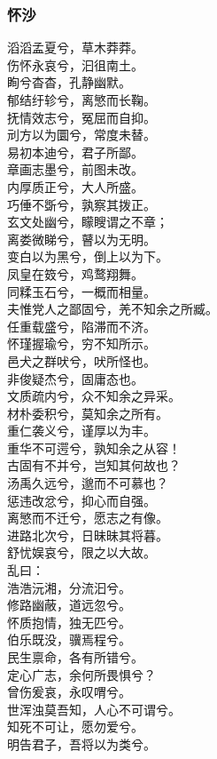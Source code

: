 \documentclass[]{article}
\begin{document}
\hypertarget{header-n2861}{%
\subsubsection{怀沙}\label{header-n2861}}

滔滔孟夏兮，草木莽莽。\\
伤怀永哀兮，汩徂南土。\\
眴兮杳杳，孔静幽默。\\
郁结纡轸兮，离慜而长鞠。\\
抚情效志兮，冤屈而自抑。\\
刓方以为圜兮，常度未替。\\
易初本迪兮，君子所鄙。\\
章画志墨兮，前图未改。\\
内厚质正兮，大人所盛。\\
巧倕不斲兮，孰察其拨正。\\
玄文处幽兮，矇瞍谓之不章；\\
离娄微睇兮，瞽以为无明。\\
变白以为黑兮，倒上以为下。\\
凤皇在笯兮，鸡鹜翔舞。\\
同糅玉石兮，一概而相量。\\
夫惟党人之鄙固兮，羌不知余之所臧。\\
任重载盛兮，陷滞而不济。\\
怀瑾握瑜兮，穷不知所示。\\
邑犬之群吠兮，吠所怪也。\\
非俊疑杰兮，固庸态也。\\
文质疏内兮，众不知余之异采。\\
材朴委积兮，莫知余之所有。\\
重仁袭义兮，谨厚以为丰。\\
重华不可遌兮，孰知余之从容！\\
古固有不并兮，岂知其何故也？\\
汤禹久远兮，邈而不可慕也？\\
惩违改忿兮，抑心而自强。\\
离慜而不迁兮，愿志之有像。\\
进路北次兮，日昧昧其将暮。\\
舒忧娱哀兮，限之以大故。\\
乱曰：\\
浩浩沅湘，分流汩兮。\\
修路幽蔽，道远忽兮。\\
怀质抱情，独无匹兮。\\
伯乐既没，骥焉程兮。\\
民生禀命，各有所错兮。\\
定心广志，余何所畏惧兮？\\
曾伤爰哀，永叹喟兮。\\
世浑浊莫吾知，人心不可谓兮。\\
知死不可让，愿勿爱兮。\\
明告君子，吾将以为类兮。
\end{document}
